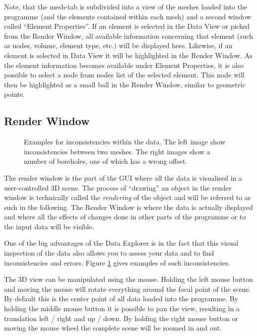 Note, that the mesh-tab is subdivided into a view of the meshes loaded into the programme (and the elements contained within each mesh) and a second window called ``Element Properties''. If an element is selected in the Data View or picked from the Render Window, all available information concerning that element (such as nodes, volume, element type, etc.) will be displayed here. Likewise, if an element is selected in Data View it will be highlighted in the Render Window. As the element information becomes available under Element Properties, it is also possible to select a node from nodes list of the selected element. This node will then be highlighted as a small ball in the Render Window, similar to geometric points.

\subsection{Render Window}

\begin{figure}[tb]
\begin{center}
\enspace
{}
\end{center}
\caption{Examples for inconsistencies within the data. The left image show inconsistencies between two meshes. The right images show a number of boreholes, one of which has a wrong offset.} \label{fig:error}
\end{figure}

The render window is the part of the GUI where all the data is visualised in a user-controlled 3D scene. The process of ``drawing'' an object in the render window is technically called the \emph{rendering} of the object and will be referred to as such in the following. The Render Window is where the data is actually displayed and where all the effects of changes done in other parts of the programme or to the input data will be visible.

One of the big advantages of the Data Explorer is in the fact that this visual inspection of the data also allows you to assess your data and to find inconsistencies and errors. Figure \ref{fig:error} gives examples of such inconsistencies.

The 3D view can be manipulated using the mouse. Holding the left mouse button and moving the mouse will rotate everything around the focal point of the scene. By default this is the center point of all data loaded into the programme. By holding the middle mouse button it is possible to pan the view, resulting in a translation left / right and up / down. By holding the right mouse button or moving the mouse wheel the complete scene will be zoomed in and out.

